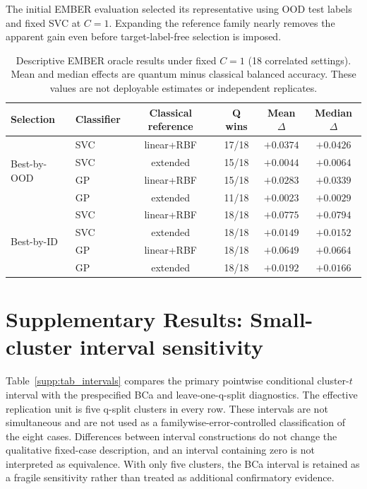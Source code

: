 \documentclass[11pt]{article}
\begin{document}
The initial EMBER evaluation selected its representative using OOD test
labels and fixed SVC at $C=1$. Expanding the reference family nearly removes
the apparent gain even before target-label-free selection is imposed.

\begin{table}[ht]
\centering
\caption{Descriptive EMBER oracle results under fixed $C=1$ (18 correlated
settings). Mean and median effects are quantum minus classical balanced
accuracy. These values are not deployable estimates or independent
replicates.}
\label{supp:tab_oracle}
\small
\begin{tabular}{llcccc}
\toprule
Selection & Classifier & Classical reference & Q wins & Mean $\Delta$ & Median $\Delta$ \\
\midrule
\multirow{4}{*}{Best-by-OOD}
 & SVC & linear+RBF & 17/18 & $+0.0374$ & $+0.0426$ \\
 & SVC & extended & 15/18 & $+0.0044$ & $+0.0064$ \\
 & GP & linear+RBF & 15/18 & $+0.0283$ & $+0.0339$ \\
 & GP & extended & 11/18 & $+0.0023$ & $+0.0029$ \\
\midrule
\multirow{4}{*}{Best-by-ID}
 & SVC & linear+RBF & 18/18 & $+0.0775$ & $+0.0794$ \\
 & SVC & extended & 18/18 & $+0.0149$ & $+0.0152$ \\
 & GP & linear+RBF & 18/18 & $+0.0649$ & $+0.0664$ \\
 & GP & extended & 18/18 & $+0.0192$ & $+0.0166$ \\
\bottomrule
\end{tabular}
\end{table}

\section*{Supplementary Results: Small-cluster interval sensitivity}
\label{supp:intervals}

Table~\ref{supp:tab_intervals} compares the primary pointwise conditional
cluster-$t$ interval with the prespecified BCa and leave-one-q-split
diagnostics. The effective replication unit is five q-split clusters in every
row. These intervals are not simultaneous and are not used as a
familywise-error-controlled classification of the eight cases. Differences
between interval constructions do not change the qualitative fixed-case
description, and an interval containing zero is not interpreted as
equivalence. With only five clusters, the BCa interval is retained as a
fragile sensitivity rather than treated as additional confirmatory evidence.
\end{document}

